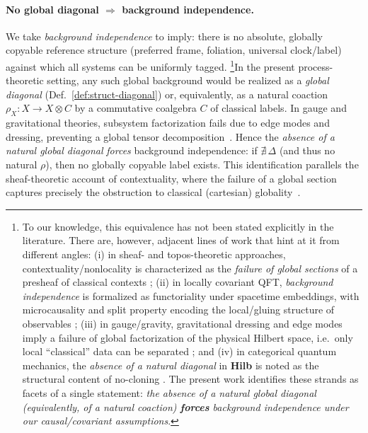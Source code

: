 \documentclass[11pt]{article}
\theoremstyle{upright}
\begin{document}
\paragraph{No global diagonal $\Rightarrow$ background independence.}
We take \emph{background independence} to imply: there is no absolute, globally copyable reference structure (preferred frame, foliation, universal clock/label) against which all systems can be uniformly tagged. \footnote{To our knowledge, this equivalence has not been stated explicitly in the literature. There are, however, adjacent lines of work that hint at it from different angles: (i) in sheaf- and topos-theoretic approaches, contextuality/nonlocality is characterized as the \emph{failure of global sections} of a presheaf of classical contexts \cite{AbramskyBrandenburger2011,DoeringIsham2008}; (ii) in locally covariant QFT, \emph{background independence} is formalized as functoriality under spacetime embeddings, with microcausality and split property encoding the local/gluing structure of observables \cite{BrunettiFredenhagenVerch2003,BuchholzWichmann1986,DoplicherLongo1984}; (iii) in gauge/gravity, gravitational dressing and edge modes imply a failure of global factorization of the physical Hilbert space, i.e.\ only local “classical” data can be separated \cite{DonnellyFreidel2016,DonnellyWall2016}; and (iv) in categorical quantum mechanics, the \emph{absence of a natural diagonal} in \textbf{Hilb} is noted as the structural content of no-cloning \cite{AbramskyCoecke2004}. The present work identifies these strands as facets of a single statement: \emph{the absence of a natural global diagonal (equivalently, of a natural coaction) \textbf{forces} background independence under our causal/covariant assumptions}.}In the present process-theoretic setting, any such global background would be realized as a \emph{global diagonal} (Def.~\ref{def:struct-diagonal}) or, equivalently, as a natural coaction $\rho_X:X\!\to\!X\!\otimes\!C$ by a commutative coalgebra $C$ of classical labels. In gauge and gravitational theories, subsystem factorization fails 
due to edge modes and dressing, preventing a global tensor decomposition~\cite{DonnellyFreidel2016}. Hence the \emph{absence of a natural global diagonal} \emph{forces} background independence: if $\nexists\,\Delta$ (and thus no natural $\rho$), then no globally copyable label exists. This identification parallels the sheaf-theoretic account of contextuality, where the failure of a global section captures precisely the obstruction to classical (cartesian) globality~\cite{AbramskyBrandenburger2011}. 
\end{document}
